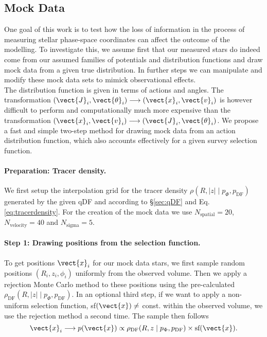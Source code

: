 \subsection{Mock Data} \label{sec:mockdata}

One goal of this work is to test how the loss of information in the process of measuring stellar phase-space coordinates can affect the outcome of the modelling. To investigate this, we assume first that our measured stars do indeed come from our assumed families of potentials and distribution functions and draw mock data from a given true distribution. In further steps we can manipulate and modify these mock data sets to mimick observational effects.\\
The distribution function is given in terms of actions and angles. The transformation $(\vect{J}_i,\vect{\theta}_i) \longrightarrow (\vect{x}_i,\vect{v}_i)$ is however difficult to perform and computationally much more expensive than the transformation $(\vect{x}_i,\vect{v}_i) \longrightarrow (\vect{J}_i,\vect{\theta}_i)$. We propose a fast and simple two-step method for drawing mock data from an action distribution function, which also accounts effectively for a given survey selection function.


\paragraph{Preparation: Tracer density.} We first setup the interpolation grid for the tracer density $\rho(R,|z| \mid p_\Phi, p_\text{DF})$ generated by the given qDF and according to \S\ref{sec:qDF} and Eq. \ref{eq:tracerdensity}. For the creation of the mock data we use $N_\text{spatial} = 20$, $N_\text{velocity} = 40$ and $N_\text{sigma}=5$.

\paragraph{Step 1: Drawing positions from the selection function.} To get positions $\vect{x}_i$ for our mock data stars, we first sample random positions $(R_i,z_i,\phi_i)$ uniformly from the observed volume. Then we apply a rejection Monte Carlo method to these positions using the pre-calculated $\rho_\text{DF}(R,|z| \mid p_{\Phi},p_\text{DF})$. In an optional third step, if we want to apply a non-uniform selection function, sf$(\vect{x}) \neq $ const. within the observed volume, we use the rejection method a second time. The sample then follows 
\begin{equation*}
\vect{x}_i \longrightarrow p(\vect{x}) \propto \rho_\text{DF}(R,z \mid p_{\Phi},p_\text{DF}) \times \text{sf}(\vect{x}).
\end{equation*}

